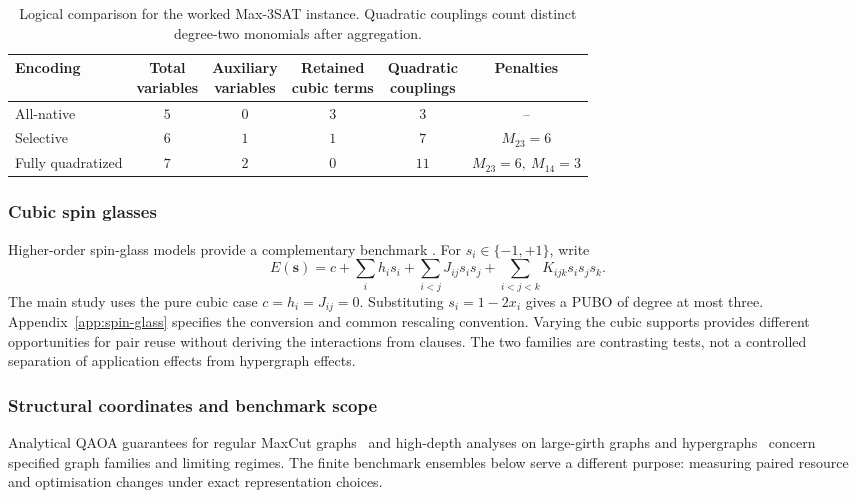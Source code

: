 \documentclass[a4paper,onecolumn,11pt,unpublished]{quantumarticle}
\theoremstyle{remark}
\begin{document}
\begin{table}[t]
    \centering
    \small
    \caption{Logical comparison for the worked Max-3SAT instance. Quadratic
    couplings count distinct degree-two monomials after aggregation.}
    \label{tab:max3sat-worked-comparison}
    \begin{tabular}{@{}lccccc@{}}
        \toprule
        Encoding
        & \shortstack{Total\\variables}
        & \shortstack{Auxiliary\\variables}
        & \shortstack{Retained\\cubic terms}
        & \shortstack{Quadratic\\couplings}
        & Penalties\\
        \midrule
        All-native & $5$ & $0$ & $3$ & $3$  & --\\
        Selective  & $6$ & $1$ & $1$ & $7$  & $M_{23}=6$\\
        Fully quadratized & $7$ & $2$ & $0$ & $11$
            & $M_{23}=6,\ M_{14}=3$\\
        \bottomrule
    \end{tabular}
\end{table}

\subsubsection{Cubic spin glasses}

Higher-order spin-glass models provide a complementary benchmark
\cite{Basso2022,PelofskeShortDepth2024,Pelofske2024}.
For $s_i\in\{-1,+1\}$, write
\begin{equation}
 E(\bm s)=c+\sum_i h_is_i+\sum_{i<j}J_{ij}s_is_j
 +\sum_{i<j<k}K_{ijk}s_is_js_k.
 \label{eq:cubic-spin}
\end{equation}
The main study uses the pure cubic case $c=h_i=J_{ij}=0$.
Substituting $s_i=1-2x_i$ gives a PUBO of degree at most three.
Appendix~\ref{app:spin-glass} specifies the conversion and common rescaling
convention. Varying the cubic supports provides different opportunities for
pair reuse without deriving the interactions from clauses. The two families
are contrasting tests, not a controlled separation of application effects
from hypergraph effects.

\subsubsection{Structural coordinates and benchmark scope}
Analytical QAOA guarantees for regular MaxCut graphs~\cite{Wurtz2021}
and high-depth analyses on large-girth graphs and
hypergraphs~\cite{BassoHighDepth2022} concern specified graph families
and limiting regimes. The finite benchmark ensembles below serve a
different purpose: measuring paired resource and optimisation changes
under exact representation choices.
\end{document}
